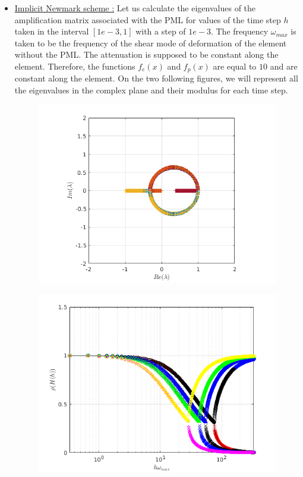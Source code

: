 \begin{itemize}
\item \underline{Implicit Newmark scheme :} Let us calculate the eigenvalues of the amplification matrix associated with the PML for values of the time step $h$ taken in the interval $[1e-3, 1] $ with a step of $1e-3$. The frequency $\omega_{max}$ is taken to be the frequency of the shear mode of deformation of the element without the PML.
The attenuation is supposed to be constant along the element. Therefore, the functions $f_e(x)$ and $f_p(x)$ are equal to $10$ and are constant along the element.
On the two following figures, we will represent all the eigenvalues in the complex plane and their modulus for each time step. 
\begin{figure}[H]
\centering
\begin{minipage}{.5\textwidth}
  \centering
  \includegraphics[width=1.\linewidth]{images/eig_pml_imp_10.png}
  \label{fig:eig_pml_imp_10}
\end{minipage}%
\begin{minipage}{.5\textwidth}
  \centering
  \includegraphics[width=1.\linewidth]{images/spect_rad_pml_imp_10.png}

\end{minipage}
\end{figure}
\end{itemize}
